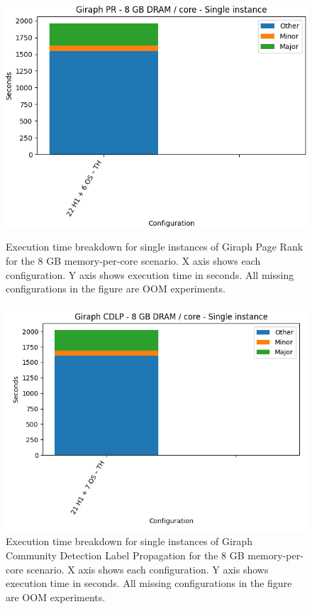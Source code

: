 \begin{figure}[thbp]
        \centering
    \includegraphics[width=\linewidth]{./fig/g_pr64_single.png}
    \caption{Execution time breakdown for single instances of Giraph
    Page Rank for the 8 GB memory-per-core scenario. X axis shows each configuration.
        Y axis shows execution time in seconds. All missing configurations in the figure are OOM experiments.}
    \label{fig:g_pr64_single}
    \includegraphics[width=\linewidth]{./fig/g_cdlp64_single.png}
    \caption{Execution time breakdown for single instances of Giraph
    Community Detection Label Propagation for the 8 GB memory-per-core scenario. X axis shows each configuration. 
        Y axis shows execution time in seconds. All missing configurations in the figure are OOM experiments.}
    \label{fig:g_cdlp64_single}
\end{figure}

